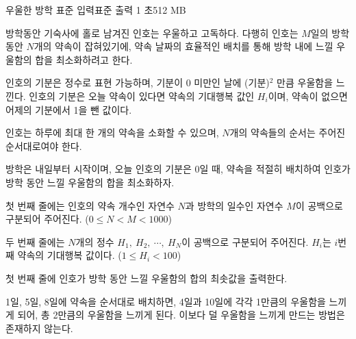\begin{problem}{우울한 방학}
    {표준 입력}{표준 출력}
    {1 초}{512 MB}{}
    
    방학동안 기숙사에 홀로 남겨진 인호는 우울하고 고독하다. 다행히 인호는 $ M $일의 방학 동안 $ N $개의 약속이 잡혀있기에, 약속 날짜의 효율적인 배치를 통해 방학 내에 느낄 우울함의 합을 최소화하려고 한다.
    
    인호의 기분은 정수로 표현 가능하며, 기분이 0 미만인 날에 (기분)$ ^2 $ 만큼 우울함을 느낀다. 인호의 기분은 오늘 약속이 있다면 약속의 기대행복 값인 $ H_i $이며, 약속이 없으면 어제의 기분에서 1을 뺀 값이다.
    
    인호는 하루에 최대 한 개의 약속을 소화할 수 있으며, $ N $개의 약속들의 순서는 주어진 순서대로여야 한다.
    
    방학은 내일부터 시작이며, 오늘 인호의 기분은 0일 때, 약속을 적절히 배치하여 인호가 방학 동안 느낄 우울함의 합을 최소화하자.
    
    \InputFile
    첫 번째 줄에는 인호의 약속 개수인 자연수 $ N $과 방학의 일수인 자연수 $ M $이 공백으로 구분되어 주어진다. ($ 0 \leq N < M < 1000 $)
    
    두 번째 줄에는 $ N $개의 정수 $ H_1,\ H_2,\ \cdots,\ H_N $이 공백으로 구분되어 주어진다. $ H_i $는 $ i $번째 약속의 기대행복 값이다. ($ 1 \leq H_i < 100 $)
    
    \OutputFile
    첫 번째 줄에 인호가 방학 동안 느낄 우울함의 합의 최솟값을 출력한다.
    
    \Examples
    
    \begin{example}
    \end{example}
    
    \Explanation
    1일, 5일, 8일에 약속을 순서대로 배치하면, 4일과 10일에 각각 1만큼의 우울함을 느끼게 되어, 총 2만큼의 우울함을 느끼게 된다. 이보다 덜 우울함을 느끼게 만드는 방법은 존재하지 않는다.
    
\end{problem}

